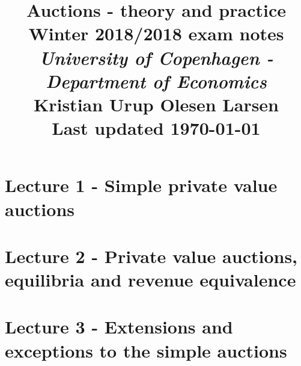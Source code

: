 \documentclass[12pt, a4paper]{article}
\theoremstyle{definition}
\begin{document}
\begin{spacing}{1.213}

\title{ Auctions - theory and practice  \\ \Large Winter 2018/2018 exam notes \\ \large \textit{University of Copenhagen - Department of Economics}  \\
\normalsize Kristian Urup Olesen Larsen \\
\normalsize Last updated \today  } %
\date{} %
\maketitle %
\setcounter{page}{1} %


\pagebreak

\tableofcontents
\newpage

\section{Lecture 1 - Simple private value auctions}


\section{Lecture 2 - Private value auctions, equilibria and revenue equivalence}


\section{Lecture 3 - Extensions and exceptions to the simple auctions}

\end{spacing}
\end{document}
